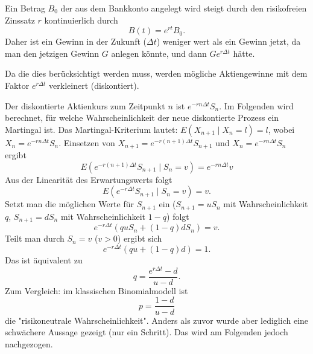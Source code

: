 \begin{lemma}
Ein Betrag $B_0$ der aus dem Bankkonto angelegt wird steigt durch den risikofreien Zinssatz $r$ kontinuierlich durch
$$B(t) = e^{rt}B_0.$$
Daher ist ein Gewinn in der Zukunft ($\Delta t$) weniger wert als ein Gewinn jetzt, da man den jetzigen Gewinn $G$ anlegen könnte, und 
dann $Ge^{r \Delta t}$ hätte. 

Da die dies berücksichtigt werden muss,
werden mögliche Aktiengewinne mit dem Faktor $e^{r \Delta t}$ verkleinert (diskontiert).

Der diskontierte Aktienkurs zum Zeitpunkt $n$ ist $e^{-r n \Delta t} S_n$.
Im Folgenden wird berechnet, für welche Wahrscheinlichkeit der neue diskontierte Prozess
ein Martingal ist. Das Martingal-Kriterium lautet: $E(X_{n+1} \mid X_n = l) = l$, wobei $X_n = e^{-r n \Delta t} S_n$.
Einsetzen von $X_{n+1} = e^{-r (n+1) \Delta t} S_{n+1}$ und $X_n = e^{-r n \Delta t} S_n$ ergibt
$$
E(e^{-r (n+1) \Delta t} S_{n+1} \mid S_n = v) = e^{-r n \Delta t} v
$$
Aus der Linearität des Erwartungswerts folgt
$$
E(e^{-r \Delta t} S_{n+1} \mid S_n=v) = v.
$$
Setzt man die möglichen Werte für $S_{n+1}$ ein ($S_{n+1} = u S_n$ mit Wahrscheinlichkeit $q$, $S_{n+1} = d S_n$ mit Wahrscheinlichkeit $1-q$) folgt
$$
e^{-r \Delta t} \left( q u S_n + (1-q) d S_n \right) = v.
$$
Teilt man durch $S_n = v$ ($v > 0$) ergibt sich
$$
e^{-r \Delta t} \left( q u + (1-q) d \right) = 1.
$$
Das ist äquivalent zu
$$
q = \frac{e^{r \Delta t} - d}{u - d}.
$$
Zum Vergleich: im klassischen Binomialmodell ist 
$$p = \frac{1 - d}{u - d}$$
die "risikoneutrale Wahrscheinlichkeit". Anders als zuvor
wurde aber lediglich eine schwächere Aussage gezeigt (nur ein Schritt). 
Das wird am Folgenden jedoch nachgezogen.

\end{lemma}

